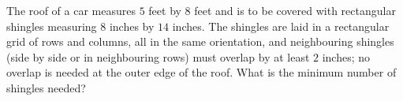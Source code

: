The roof of a car measures $5$ feet by $8$ feet and is to be covered with rectangular shingles measuring $8$ inches by $14$ inches. The shingles are laid in a rectangular grid of rows and columns, all in the same orientation, and neighbouring shingles (side by side or in neighbouring rows) must overlap by at least $2$ inches; no overlap is needed at the outer edge of the roof. What is the minimum number of shingles needed?
